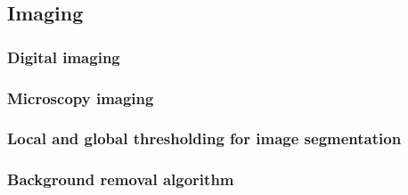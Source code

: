     \subsection{Imaging}
        \subsubsection{Digital imaging}
            
        \subsubsection{Microscopy imaging}
            
        \subsubsection{Local and global thresholding for image segmentation}
            \label{section:thresholding-theory}
            
        \subsubsection{Background removal algorithm}
            \label{section:background-removal}
            